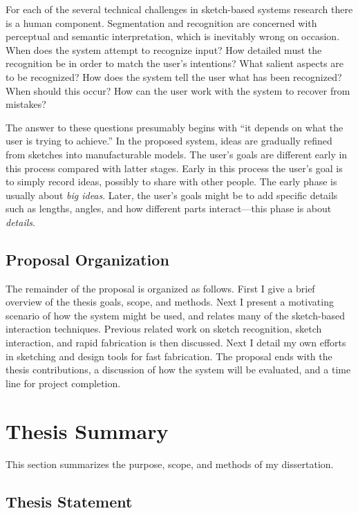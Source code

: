 \documentclass[12pt]{article}
\begin{document}
For each of the several technical challenges in sketch-based systems
research there is a human component. Segmentation and recognition are
concerned with perceptual and semantic interpretation, which is
inevitably wrong on occasion. When does the system attempt to
recognize input? How detailed must the recognition be in order to
match the user's intentions? What salient aspects are to be
recognized? How does the system tell the user what has been
recognized? When should this occur? How can the user work with the
system to recover from mistakes?

The answer to these questions presumably begins with ``it depends on
what the user is trying to achieve.'' In the proposed system, ideas
are gradually refined from sketches into manufacturable models. The
user's goals are different early in this process compared with latter
stages. Early in this process the user's goal is to simply record
ideas, possibly to share with other people. The early phase is usually
about \textit{big ideas}. Later, the user's goals might be to add
specific details such as lengths, angles, and how different parts
interact---this phase is about \textit{details}.

\subsection{Proposal Organization}

The remainder of the proposal is organized as follows. First I give a
brief overview of the thesis goals, scope, and methods. Next I present
a motivating scenario of how the system might be used, and relates
many of the sketch-based interaction techniques. Previous related work
on sketch recognition, sketch interaction, and rapid fabrication is
then discussed. Next I detail my own efforts in sketching and design
tools for fast fabrication. The proposal ends with the thesis
contributions, a discussion of how the system will be evaluated, and a
time line for project completion.

\section{Thesis Summary}

This section summarizes the purpose, scope, and methods of my
dissertation.

\subsection{Thesis Statement}
\end{document}
